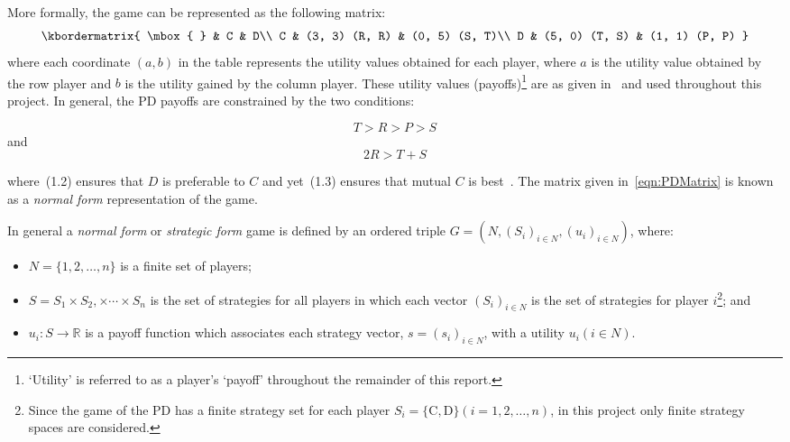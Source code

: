 More formally, the game can be represented as the following matrix:
\begin{equation}
    \kbordermatrix{
        \mbox{ } & C & D\\ 
        C & (3, 3) (R, R) & (0, 5) (S, T)\\ 
        D & (5, 0) (T, S) & (1, 1) (P, P)
    }
\end{equation}\label{eqn:PDMatrix}
where each coordinate \((a, b)\) in the table represents the utility values
obtained for each player, where \(a\) is the utility value obtained by the row
player and \(b\) is the utility gained by the column player. These utility
values (payoffs)\footnote{`Utility' is referred to as a player's `payoff'
throughout the remainder of this report.} are as given
in~\cite{axelrod1980effective} and
used throughout this project. In general, the PD payoffs are constrained by the
two conditions:

\begin{equation}
    T > R > P > S
\end{equation}\label{eqn:PD_1}
and
\begin{equation}
    2R > T + S
\end{equation}\label{eqn:PD_2}

where~(1.2) ensures that \(D\) is preferable to \(C\) and
yet~(1.3) ensures that mutual \(C\) is
best~\cite{Knight2019,Press2012}. The matrix given in~\eqref{eqn:PDMatrix} is
known as a \textit{normal form} representation of the game.

\begin{definition}
    In general a \textit{normal form} or \textit{strategic form} game is defined
    by an ordered triple \(G = (N, {(S_i)}_{i \in N}, {(u_i)}_{i \in N})\), where:
    \begin{itemize}
        \item \(N = \{1, 2,\ldots, n\} \) is a finite set of players;
        \item \(S = S_1 \times S_2, \times \cdots \times S_n\) is the set of
        strategies for all players in which each vector \({(S_i)}_{i \in N}\) is
        the set of strategies for player \(i\)\footnote{Since the game of the PD has a finite strategy set for each player \(S_i=\{\text{C},
        \text{D}\} (i = 1, 2, \ldots, n)\), in this project only finite
        strategy spaces are considered.}; and
        \item \(u_i : S \to \mathbb{R}\) is a payoff function which associates each
        strategy vector, \(s = {(s_i)}_{i \in N}\), with a utility
        \(u_i(i \in N)\).
    \end{itemize}
\end{definition}

